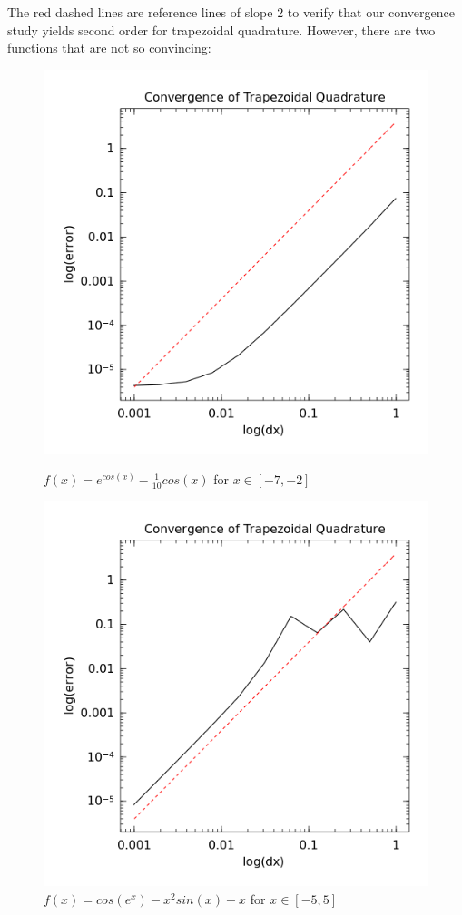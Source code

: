 \documentclass[10pt]{article}
\begin{document}
\noindent The red dashed lines are reference lines of slope 2 to verify that our convergence study yields second order for trapezoidal quadrature. However, there are two functions that are not so convincing:

\pagebreak

\begin{figure}[h]
\centering
\begin{minipage}{.5\textwidth}
  \centering
  \includegraphics[width=.85\linewidth]{trap_case6.png}
  \caption*{$f(x) = e^{cos(x)} - \frac{1}{10}cos(x)$ for $x \in [-7,-2]$}
  \label{fig:test1}
\end{minipage}%
\begin{minipage}{.5\textwidth}
  \centering
  \includegraphics[width=.85\linewidth]{trap_case8.png}
  \caption*{$f(x) = cos(e^x) - x^2sin(x) - x$ for $x \in [-5,5]$}
  \label{fig:test2}
\end{minipage}
\end{figure}
\end{document}

